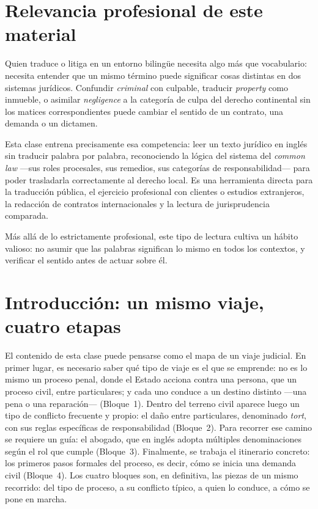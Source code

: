\documentclass[12pt,oneside]{book}
\begin{document}
\frontmatter

\chapter*{Relevancia profesional de este material}

Quien traduce o litiga en un entorno bilingüe necesita algo más que vocabulario: necesita entender que un mismo término puede significar cosas distintas en dos sistemas jurídicos. Confundir \textit{criminal} con culpable, traducir \textit{property} como inmueble, o asimilar \textit{negligence} a la categoría de culpa del derecho continental sin los matices correspondientes puede cambiar el sentido de un contrato, una demanda o un dictamen.

Esta clase entrena precisamente esa competencia: leer un texto jurídico en inglés sin traducir palabra por palabra, reconociendo la lógica del sistema del \textit{common law} ---sus roles procesales, sus remedios, sus categorías de responsabilidad--- para poder trasladarla correctamente al derecho local. Es una herramienta directa para la traducción pública, el ejercicio profesional con clientes o estudios extranjeros, la redacción de contratos internacionales y la lectura de jurisprudencia comparada.

Más allá de lo estrictamente profesional, este tipo de lectura cultiva un hábito valioso: no asumir que las palabras significan lo mismo en todos los contextos, y verificar el sentido antes de actuar sobre él.

\chapter*{Introducción: un mismo viaje, cuatro etapas}

El contenido de esta clase puede pensarse como el mapa de un viaje judicial. En primer lugar, es necesario saber qué tipo de viaje es el que se emprende: no es lo mismo un proceso penal, donde el Estado acciona contra una persona, que un proceso civil, entre particulares; y cada uno conduce a un destino distinto ---una pena o una reparación--- (Bloque~1). Dentro del terreno civil aparece luego un tipo de conflicto frecuente y propio: el daño entre particulares, denominado \textit{tort}, con sus reglas específicas de responsabilidad (Bloque~2). Para recorrer ese camino se requiere un guía: el abogado, que en inglés adopta múltiples denominaciones según el rol que cumple (Bloque~3). Finalmente, se trabaja el itinerario concreto: los primeros pasos formales del proceso, es decir, cómo se inicia una demanda civil (Bloque~4). Los cuatro bloques son, en definitiva, las piezas de un mismo recorrido: del tipo de proceso, a su conflicto típico, a quien lo conduce, a cómo se pone en marcha.
\end{document}
